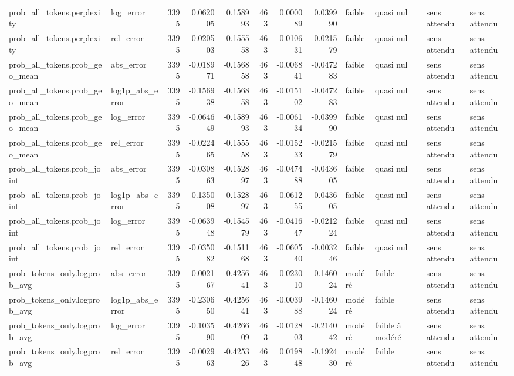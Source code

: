 \begin{longtable}{llrrrrrrllll}
prob_all_tokens.perplexity & log_error & 3395 & 0.062005 & 0.158993 & 463 & 0.000089 & 0.039990 & faible & quasi nul & sens attendu & sens attendu \\
prob_all_tokens.perplexity & rel_error & 3395 & 0.020503 & 0.155558 & 463 & 0.010631 & 0.021579 & faible & quasi nul & sens attendu & sens attendu \\
prob_all_tokens.prob_geo_mean & abs_error & 3395 & -0.018971 & -0.156858 & 463 & -0.006841 & -0.047283 & faible & quasi nul & sens attendu & sens attendu \\
prob_all_tokens.prob_geo_mean & log1p_abs_error & 3395 & -0.156938 & -0.156858 & 463 & -0.015102 & -0.047283 & faible & quasi nul & sens attendu & sens attendu \\
prob_all_tokens.prob_geo_mean & log_error & 3395 & -0.064649 & -0.158993 & 463 & -0.006134 & -0.039990 & faible & quasi nul & sens attendu & sens attendu \\
prob_all_tokens.prob_geo_mean & rel_error & 3395 & -0.022465 & -0.155558 & 463 & -0.015233 & -0.021579 & faible & quasi nul & sens attendu & sens attendu \\
prob_all_tokens.prob_joint & abs_error & 3395 & -0.030863 & -0.152897 & 463 & -0.047488 & -0.043605 & faible & quasi nul & sens attendu & sens attendu \\
prob_all_tokens.prob_joint & log1p_abs_error & 3395 & -0.135008 & -0.152897 & 463 & -0.061255 & -0.043605 & faible & quasi nul & sens attendu & sens attendu \\
prob_all_tokens.prob_joint & log_error & 3395 & -0.063948 & -0.154579 & 463 & -0.041647 & -0.021224 & faible & quasi nul & sens attendu & sens attendu \\
prob_all_tokens.prob_joint & rel_error & 3395 & -0.035082 & -0.151168 & 463 & -0.060540 & -0.003246 & faible & quasi nul & sens attendu & sens attendu \\
prob_tokens_only.logprob_avg & abs_error & 3395 & -0.002167 & -0.425641 & 463 & 0.023010 & -0.146024 & modéré & faible & sens attendu & sens attendu \\
prob_tokens_only.logprob_avg & log1p_abs_error & 3395 & -0.230650 & -0.425641 & 463 & -0.003988 & -0.146024 & modéré & faible & sens attendu & sens attendu \\
prob_tokens_only.logprob_avg & log_error & 3395 & -0.103590 & -0.426609 & 463 & -0.012803 & -0.214042 & modéré & faible à modéré & sens attendu & sens attendu \\
prob_tokens_only.logprob_avg & rel_error & 3395 & -0.002963 & -0.425326 & 463 & 0.019848 & -0.192430 & modéré & faible & sens attendu & sens attendu \\

\end{longtable}

